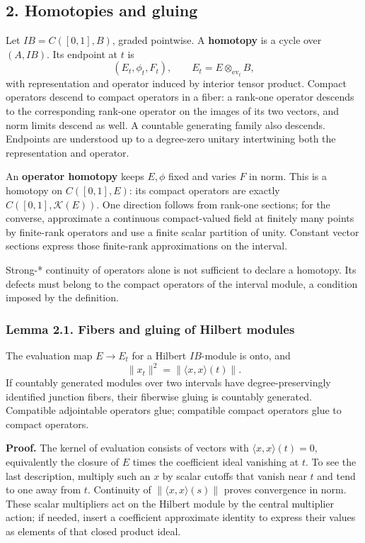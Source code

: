 \documentclass[
  11pt,
]{article}
\begin{document}
\subsection{2. Homotopies and gluing}\label{homotopies-and-gluing}

Let \(IB=C([0,1],B)\), graded pointwise. A \textbf{homotopy} is a cycle
over \((A,IB)\). Its endpoint at \(t\) is \[
(E_t,\phi_t,F_t),\qquad
E_t=E\otimes_{\mathrm{ev}_t}B,
\tag{2.1}
\] with representation and operator induced by interior tensor product.
Compact operators descend to compact operators in a fiber: a rank-one
operator descends to the corresponding rank-one operator on the images
of its two vectors, and norm limits descend as well. A countable
generating family also descends. Endpoints are understood up to a
degree-zero unitary intertwining both the representation and operator.

An \textbf{operator homotopy} keeps \(E,\phi\) fixed and varies \(F\) in
norm. This is a homotopy on \(C([0,1],E)\): its compact operators are
exactly \(C([0,1],\mathcal K(E))\). One direction follows from rank-one
sections; for the converse, approximate a continuous compact-valued
field at finitely many points by finite-rank operators and use a finite
scalar partition of unity. Constant vector sections express those
finite-rank approximations on the interval.

Strong-* continuity of operators alone is not sufficient to declare a
homotopy. Its defects must belong to the compact operators of the
interval module, a condition imposed by the definition.

\subsubsection{Lemma 2.1. Fibers and gluing of Hilbert
modules}\label{lemma-2.1.-fibers-and-gluing-of-hilbert-modules}

The evaluation map \(E\to E_t\) for a Hilbert \(IB\)-module is onto, and
\[
\|x_t\|^2=\|\langle x,x\rangle(t)\|.
\tag{2.2}
\] If countably generated modules over two intervals have
degree-preservingly identified junction fibers, their fiberwise gluing
is countably generated. Compatible adjointable operators glue;
compatible compact operators glue to compact operators.

\textbf{Proof.} The kernel of evaluation consists of vectors with
\(\langle x,x\rangle(t)=0\), equivalently the closure of \(E\) times the
coefficient ideal vanishing at \(t\). To see the last description,
multiply such an \(x\) by scalar cutoffs that vanish near \(t\) and tend
to one away from \(t\). Continuity of \(\|\langle x,x\rangle(s)\|\)
proves convergence in norm. These scalar multipliers act on the Hilbert
module by the central multiplier action; if needed, insert a coefficient
approximate identity to express their values as elements of that closed
product ideal.
\end{document}

